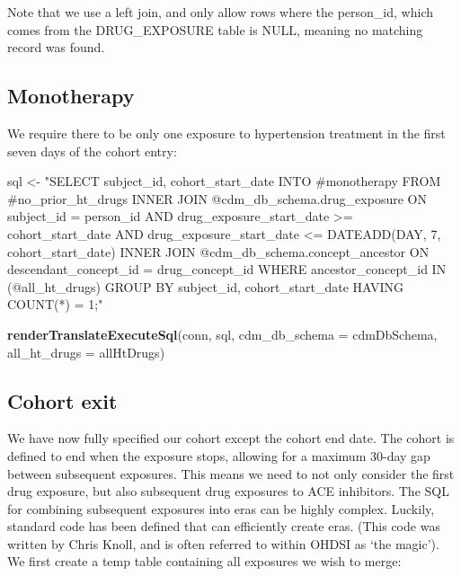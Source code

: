 \documentclass[11pt]{book}
\newenvironment{Shaded}{\begin{snugshade}}{\end{snugshade}}
\newcommand{\DataTypeTok}[1]{\textcolor[rgb]{0.13,0.29,0.53}{#1}}
\newcommand{\KeywordTok}[1]{\textcolor[rgb]{0.13,0.29,0.53}{\textbf{#1}}}
\newcommand{\NormalTok}[1]{#1}
\newcommand{\StringTok}[1]{\textcolor[rgb]{0.31,0.60,0.02}{#1}}
\theoremstyle{definition}
\theoremstyle{definition}
\theoremstyle{definition}
\theoremstyle{remark}
\begin{document}
Note that we use a left join, and only allow rows where the person\_id, which comes from the DRUG\_EXPOSURE table is NULL, meaning no matching record was found.

\hypertarget{monotherapy}{%
\subsection{Monotherapy}\label{monotherapy}}

We require there to be only one exposure to hypertension treatment in the first seven days of the cohort entry:

\begin{Shaded}
\begin{Highlighting}[]
\NormalTok{sql <-}\StringTok{ "SELECT subject_id,}
\StringTok{  cohort_start_date}
\StringTok{INTO #monotherapy}
\StringTok{FROM #no_prior_ht_drugs}
\StringTok{INNER JOIN @cdm_db_schema.drug_exposure}
\StringTok{  ON subject_id = person_id}
\StringTok{    AND drug_exposure_start_date >= cohort_start_date}
\StringTok{    AND drug_exposure_start_date <= DATEADD(DAY, 7, cohort_start_date)}
\StringTok{INNER JOIN @cdm_db_schema.concept_ancestor}
\StringTok{  ON descendant_concept_id = drug_concept_id}
\StringTok{WHERE ancestor_concept_id IN (@all_ht_drugs)}
\StringTok{GROUP BY subject_id,}
\StringTok{  cohort_start_date}
\StringTok{HAVING COUNT(*) = 1;"}

\KeywordTok{renderTranslateExecuteSql}\NormalTok{(conn, }
\NormalTok{                          sql, }
                          \DataTypeTok{cdm_db_schema =}\NormalTok{ cdmDbSchema, }
                          \DataTypeTok{all_ht_drugs =}\NormalTok{ allHtDrugs)}
\end{Highlighting}
\end{Shaded}

\hypertarget{cohort-exit}{%
\subsection{Cohort exit}\label{cohort-exit}}

We have now fully specified our cohort except the cohort end date. The cohort is defined to end when the exposure stops, allowing for a maximum 30-day gap between subsequent exposures. This means we need to not only consider the first drug exposure, but also subsequent drug exposures to ACE inhibitors. The SQL for combining subsequent exposures into eras can be highly complex. Luckily, standard code has been defined that can efficiently create eras. (This code was written by Chris Knoll, and is often referred to within OHDSI as `the magic'). We first create a temp table containing all exposures we wish to merge:
\end{document}
